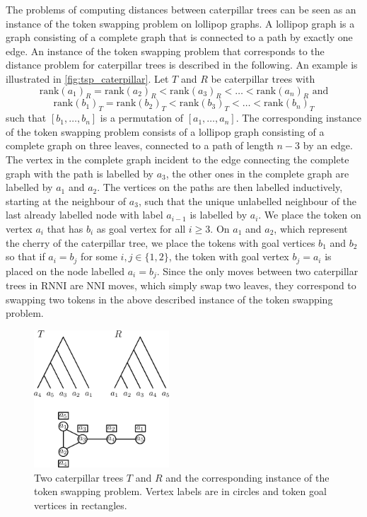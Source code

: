 \documentclass[11pt]{amsart}
\newcommand{\rnni}{\mathrm{RNNI}}
\newcommand{\rank}{\mathrm{rank}}
\newcommand{\nni}{\mathrm{NNI}}
\begin{document}
The problems of computing distances between caterpillar trees can be seen as an instance of the token swapping problem on lollipop graphs.
A lollipop graph is a graph consisting of a complete graph that is connected to a path by exactly one edge.
An instance of the token swapping problem that corresponds to the distance problem for caterpillar trees is described in the following.
An example is illustrated in \autoref{fig:tsp_caterpillar}.
Let $T$ and $R$ be caterpillar trees with
\[\rank(a_1)_R = \rank(a_2)_R < \rank(a_3)_R < \ldots < \rank(a_n)_R \text{ and}\]
\[\rank(b_1)_T = \rank(b_2)_T < \rank(b_3)_T < \ldots < \rank(b_n)_T\]
such that $[b_1, \ldots, b_n]$ is a permutation of $[a_1, \ldots, a_n]$.
The corresponding instance of the token swapping problem consists of a lollipop graph consisting of a complete graph on three leaves, connected to a path of length $n-3$ by an edge.
The vertex in the complete graph incident to the edge connecting the complete graph with the path is labelled by $a_3$, the other ones in the complete graph are labelled by $a_1$ and $a_2$.
The vertices on the paths are then labelled inductively, starting at the neighbour of $a_3$, such that the unique unlabelled neighbour of the last already labelled node with label $a_{i-1}$ is labelled by $a_i$.
We place the token on vertex $a_i$ that has $b_i$ as goal vertex for all $i \geq 3$.
On $a_1$ and $a_2$, which represent the cherry of the caterpillar tree, we place the tokens with goal vertices $b_1$ and $b_2$ so that if $a_i = b_j$ for some $i,j \in \{1,2\}$, the token with goal vertex $b_j=a_i$ is placed on the node labelled $a_i=b_j$. 
Since the only moves between two caterpillar trees in $\rnni$ are $\nni$ moves, which simply swap two leaves, they correspond to swapping two tokens in the above described instance of the token swapping problem.
\begin{figure}[ht]
	\includegraphics[width=0.45\textwidth]{tsp_caterpillar.eps}
	\caption{Two caterpillar trees $T$ and $R$ and the corresponding instance of the token swapping problem.
	Vertex labels are in circles and token goal vertices in rectangles.}
	\label{fig:tsp_caterpillar}
\end{figure}
\end{document}
